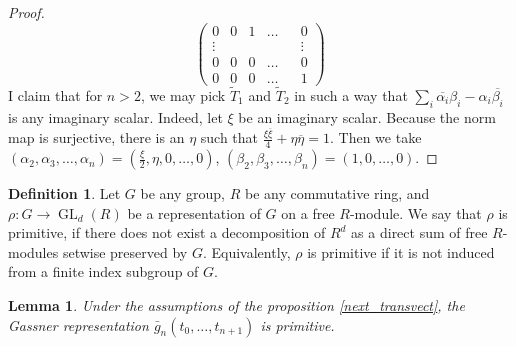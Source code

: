 \documentclass{article}
\newtheorem{lemma}{Lemma}
\theoremstyle{definition}
\newtheorem{definition}{Definition}[section]
\DeclareMathOperator{\GL}{\mathrm{GL}}
\begin{document}
\begin{proof}
$$\begin{pmatrix}
			0 & 0 & 1 & \ldots & & 0 \\
			\vdots & & & & & \vdots \\
			0 & 0 & 0 & \ldots & & 0 \\
			0 & 0 & 0 & \ldots & & 1
		\end{pmatrix}$$
		I claim that for $n > 2$, we may pick $\widetilde{T}_1$ and $\widetilde{T}_2$ in such a way that $ \sum_i \overline{\alpha_i}\beta_i - \alpha_i \overline{\beta_i} $ is any imaginary scalar. Indeed, let $\xi$ be an imaginary scalar. Because the norm map is surjective, there is an $\eta$ such that $\frac{\xi \overline{\xi}}{4} + \eta \overline{\eta}=1$. Then we take $(\alpha_2, \alpha_3, \ldots, \alpha_n) = (\frac{\xi}{2}, \eta, 0,\ldots, 0)$, $(\beta_2, \beta_3, \ldots, \beta_n) = (1,0, \ldots, 0)$.
	\end{proof}
	\begin{definition}
		Let $G$ be any group, $R$ be any commutative ring, and $\rho : G \to \GL_d(R)$ be a representation of $G$ on a free $R$-module. We say that $\rho$ is primitive, if there does not exist a decomposition of $R^d$ as a direct sum of free $R$-modules setwise preserved by $G$. Equivalently, $\rho$ is primitive if it is not induced from a finite index subgroup of $G$. %
	\end{definition}
	\begin{lemma} \label{next_prim}
		Under the assumptions of the proposition \ref{next_transvect}, the Gassner representation $\bar{g}_n(t_0, \ldots, t_{n+1})$ is primitive.
	\end{lemma}
\end{document}
